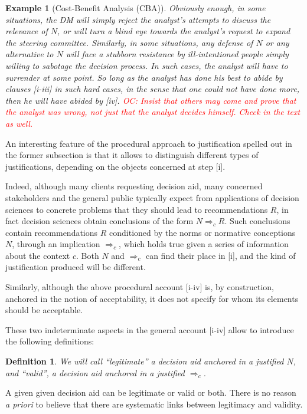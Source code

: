 \documentclass[preprint, french, english, 11pt, authoryear]{elsarticle}%
\newtheorem{example}{Example}
\newtheorem{definition}{Definition}
\newcommand{\commentOC}[1]{\textcolor{red}{OC: #1}}
\begin{document}
\begin{example}[Cost-Benefit Analysis (CBA)]
Obviously enough, in some situations, the \ac{DM} will simply reject the analyst's attempts to discuss the relevance of $N$, or will turn a blind eye towards the analyst's request to expand the steering committee. Similarly, in some situations, any defense of $N$ or any alternative to $N$ will face a stubborn resistance by ill-intentioned people simply willing to sabotage the decision process. In such cases, the analyst will have to surrender at some point. So long as the analyst has done his best to abide by clauses [i-iii] in such hard cases, in the sense that one could not have done more, then he will have abided by [iv]. \commentOC{Insist that others may come and prove that the analyst was wrong, not just that the analyst decides himself. Check in the text as well.}
\end{example}

An interesting feature of the procedural approach to justification spelled out in the former subsection is that it allows to distinguish different types of justifications, depending on the objects concerned at step [i].

Indeed, although many clients requesting decision aid, many concerned stakeholders and the general public typically expect from applications of decision sciences to concrete problems that they should lead to recommendations $R$, in fact decision sciences obtain conclusions of the form $N \Rightarrow_c R$. Such conclusions contain recommendations $R$ conditioned by the norms or normative conceptions $N$, through  an implication $\Rightarrow_c$, which holds true given a series of information about the context $c$. Both $N$ and $\Rightarrow_c$ can find their place in [i], and the kind of justification produced will be different. 

Similarly, although the above procedural account [i-iv] is, by construction, anchored in the notion of acceptability, it does not specify for whom its elements should be acceptable.

These two indeterminate aspects in the general account [i-iv] allow to introduce the following definitions:

\begin{definition}
We will call ``legitimate'' a decision aid anchored in a justified $N$, and ``valid'', a decision aid anchored in a justified  $\Rightarrow_c$. 
\end{definition}
A given given decision aid can be legitimate or valid or both. There is no reason \emph{a priori} to believe that there are systematic links between legitimacy and validity.
\end{document}
